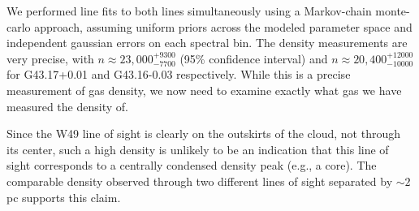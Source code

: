 We performed line fits to both lines simultaneously using a Markov-chain
monte-carlo approach, assuming uniform priors across the modeled parameter
space and independent gaussian errors on each spectral bin.  The density
measurements are very precise, with $n\approx23,000 {}^{+9300}_{-7700}$ \percc
(95\% confidence interval) and $n\approx 20,400 {}^{+12000}_{-10000}$ \percc for
G43.17+0.01 and G43.16-0.03 respectively.  While this is a precise measurement
of gas density, we now need to examine exactly what gas we have measured the
density of.



Since the W49 line of sight is clearly on the outskirts of the cloud, not
through its center, such a high density is unlikely to be an indication that
this line of sight corresponds to a centrally condensed density peak (e.g., a
core).  The comparable density observed through two different lines of sight
separated by $\sim 2$ pc supports this claim.




